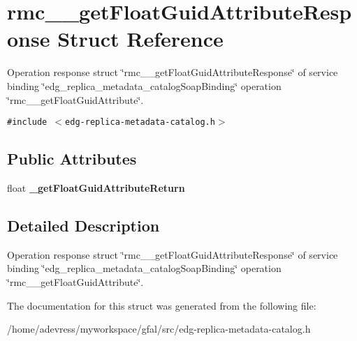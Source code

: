 \section{rmc\_\-\_\-get\-Float\-Guid\-Attribute\-Response Struct Reference}
\label{structrmc____getFloatGuidAttributeResponse}
Operation response struct \char`\"{}rmc\_\-\_\-get\-Float\-Guid\-Attribute\-Response\char`\"{} of service binding \char`\"{}edg\_\-replica\_\-metadata\_\-catalog\-Soap\-Binding\char`\"{} operation \char`\"{}rmc\_\-\_\-get\-Float\-Guid\-Attribute\char`\"{}.  


{\tt \#include $<$edg-replica-metadata-catalog.h$>$}

\subsection*{Public Attributes}
\begin{CompactItemize}
\item 
float \textbf{\_\-get\-Float\-Guid\-Attribute\-Return}\label{structrmc____getFloatGuidAttributeResponse_baa99e47b8efab7ce43c2acffb96f98f}

\end{CompactItemize}


\subsection{Detailed Description}
Operation response struct \char`\"{}rmc\_\-\_\-get\-Float\-Guid\-Attribute\-Response\char`\"{} of service binding \char`\"{}edg\_\-replica\_\-metadata\_\-catalog\-Soap\-Binding\char`\"{} operation \char`\"{}rmc\_\-\_\-get\-Float\-Guid\-Attribute\char`\"{}. 



The documentation for this struct was generated from the following file:\begin{CompactItemize}
\item 
/home/adevress/myworkspace/gfal/src/edg-replica-metadata-catalog.h\end{CompactItemize}
